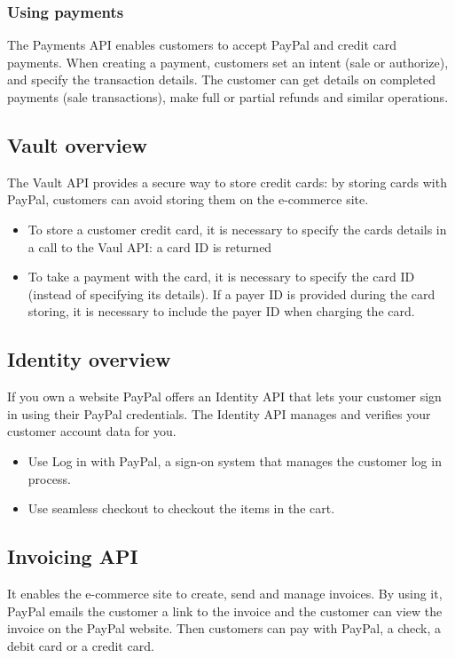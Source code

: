 \documentclass[a4paper, 10pt, titlepage]{article}
\begin{document}
\subsubsection*{Using payments}
The Payments API enables customers to accept PayPal and credit card payments. When creating a payment, customers set an intent (sale or authorize), and specify the transaction details. The customer can get details on completed payments (sale transactions), make full or partial refunds and similar operations.

\subsection{Vault overview}
The Vault API provides a secure way to store credit cards: by storing cards with PayPal, customers can avoid storing them on the e-commerce site.
\begin{itemize}
\item To store a customer credit card, it is necessary to specify the cards details in a call to the Vaul API: a card ID is returned
\item To take a payment with the card, it is necessary to specify the card ID (instead of specifying its details). If a payer ID is provided during the card storing, it is necessary to include the payer ID when charging the card.
\end{itemize}

\subsection{Identity overview}
If you own a website PayPal offers an Identity API that lets your customer sign in using their PayPal credentials. The Identity API manages and verifies your customer account data for you.
\begin{itemize}
\item Use Log in with PayPal, a sign-on system that manages the customer log in process.
\item Use seamless checkout to checkout the  items in the cart.
\end{itemize}

\subsection{Invoicing API}
It enables the e-commerce site to create, send and manage invoices. By using it, PayPal emails the customer a link to the invoice and the customer can view the invoice on the PayPal website. Then customers can pay with PayPal, a check, a debit card or a credit card.
\end{document}
